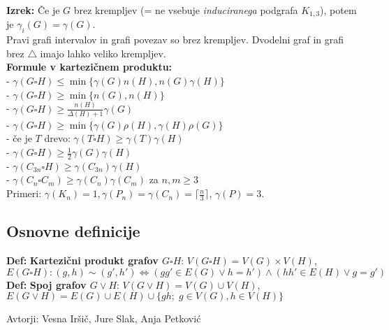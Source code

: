 \documentclass[a4paper,10pt]{article}
\theoremstyle{definition}
\let\oldtextbf\textbf
\renewcommand{\textbf}[1]{\oldtextbf{\boldmath #1}}
\begin{document}
\textbf{Izrek:} Če je $G$ brez krempljev (= ne vsebuje \textit{induciranega} podgrafa $K_{1, 3}$), potem je $\gamma_i (G) = \gamma(G)$.\\
Pravi grafi intervalov in grafi povezav so brez krempljev. Dvodelni graf in grafi brez $\triangle$ imajo lahko veliko krempljev.\\
\textbf{Formule v kartezičnem produktu:} \\
- $\gamma(G \square H) \leq \min\{ \gamma(G) n(H), n(G) \gamma(H) \}$\\
- $\gamma(G \square H) \geq \min\{ n(G), n(H) \}$\\
- $\gamma(G \square H) \geq \frac{n(H)}{\Delta(H) + 1} \gamma(G)$\\
- $\gamma(G \square H) \geq \min\{ \gamma(G) \rho(H), \gamma(H) \rho(G) \}$\\
- če je $T$ drevo: $\gamma(T \square H) \geq \gamma(T) \gamma(H)$\\
- $\gamma(G \square H) \geq \frac{1}{2} \gamma(G) \gamma(H)$\\
- $\gamma(C_{3n} \square H) \geq \gamma(C_{3n}) \gamma(H)$\\
- $\gamma(C_n \square C_m) \geq \gamma(C_n) \gamma(C_m)$ za $n, m \geq 3$\\
Primeri: $\gamma(K_n) = 1, \gamma(P_n) = \gamma(C_n) = \lceil \frac{n}{3} \rceil$, $\gamma(P) = 3$.


\subsection*{Osnovne definicije}
\textbf{Def:}  \textbf{Kartezični produkt grafov $G \square H$}:
$V(G \square H) = V(G) \times V(H)$, \\
$E(G \square H): (g,h) \sim (g',h') \iff (gg' \in E(G) \lor h=h') \land (hh' \in E(H) \lor g=g')$\\
  \textbf{Def:}  \textbf{Spoj grafov $G \vee H$}:
$V( G \vee H) = V(G) \cup V(H)$,
$E(G \vee H) = E(G) \cup E(H) \cup \{gh; \; g \in V(G), h \in V(H)\}$

\hfill Avtorji: Vesna Iršič, Jure Slak, Anja Petković
\end{document}
